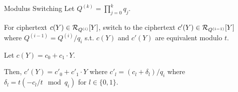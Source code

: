 \begin{frame}{Modulus Switching}
	Let $Q^{(k)} = \prod_{j = 0}^k q_j$.
	
	For ciphertext $c(Y) \in \mathcal{R}_{Q^{(i)}}[Y]$, switch to the ciphertext $c'(Y) \in \mathcal{R}_{Q^{(i-1)}}[Y]$ where $Q^{(i-1)} = Q^{(i)} / q_i$ s.t. $c(Y)$ and $c'(Y)$ are equivalent modulo $t$.
	
	Let $c(Y) = c_0 + c_1\cdot Y$.
	
	Then, $c'(Y) = c'_0 + c'_1 \cdot Y$ where $c'_l = (c_l + \delta_l)/q_i$ where $\delta_l = t (-c_l/t \mod q_i)$ for $l \in \{0,1\}$.
\end{frame}